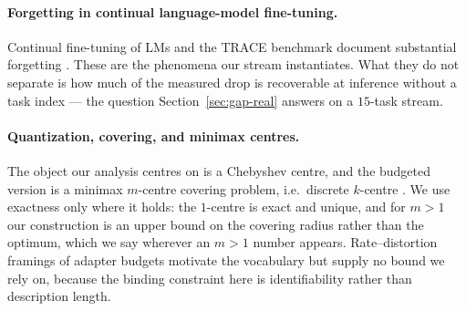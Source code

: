 \paragraph{Forgetting in continual language-model fine-tuning.}
Continual fine-tuning of LMs and the TRACE benchmark document substantial
forgetting \citep{luo2023forgetting,wang2023trace}. These are the phenomena our
stream instantiates. What they do not separate is how much of the measured drop is
recoverable at inference without a task index --- the question
Section~\ref{sec:gap-real} answers on a $15$-task stream.

\paragraph{Quantization, covering, and minimax centres.}
The object our analysis centres on is a Chebyshev centre, and the budgeted version
is a minimax $m$-centre covering problem, i.e.\ discrete $k$-centre
\citep{gonzalez1985kcentre,hochbaum1985kcentre}. We use exactness only where it
holds: the $1$-centre is exact and unique, and for $m>1$ our construction is an
upper bound on the covering radius rather than the optimum, which we say wherever
an $m>1$ number appears. Rate--distortion framings of adapter budgets
\citep{shannon1959rate} motivate the vocabulary but supply no bound we rely on,
because the binding constraint here is identifiability rather than description
length.